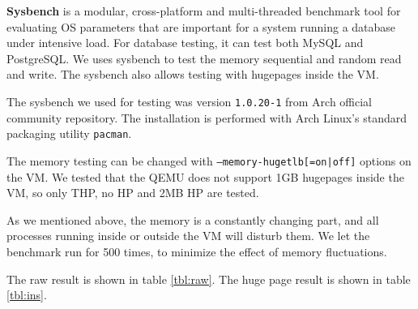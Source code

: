 \documentclass[12pt]{article}
\begin{document}
\textbf{Sysbench} is a modular, cross-platform and multi-threaded benchmark tool for evaluating OS parameters that are important for a system running a database under intensive load. For database testing, it can test both MySQL and PostgreSQL. We uses sysbench to test the memory sequential and random read and write. The sysbench also allows testing with hugepages inside the VM.

The sysbench we used for testing was version \texttt{1.0.20-1} from Arch official community repository. The installation is performed with Arch Linux’s standard packaging utility \texttt{pacman}.



The memory testing can be changed with \texttt{--memory-hugetlb[=on|off]} options on the VM. We tested that the QEMU does not support 1GB hugepages inside the VM, so only THP, no HP and 2MB HP are tested.

As we mentioned above, the memory is a constantly changing part, and all processes running inside or outside the VM will disturb them. We let the benchmark run for 500 times, to minimize the effect of memory fluctuations.



The raw result is shown in table \ref{tbl:raw}. The huge page result is shown in table \ref{tbl:ins}.
\end{document}
